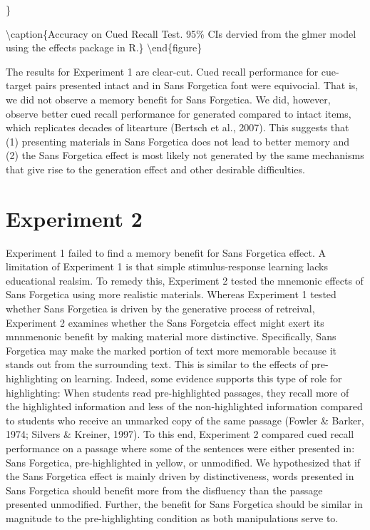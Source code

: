 \documentclass[english,doc]{apa6}
\begin{document}
\}

\textbackslash{}caption\{Accuracy on Cued Recall Test. 95\% CIs dervied from the glmer model using the effects package in R.\}\label{fig:unnamed-chunk-2}
\textbackslash{}end\{figure\}

The results for Experiment 1 are clear-cut. Cued recall performance for cue-target pairs presented intact and in Sans Forgetica font were equivocial. That is, we did not observe a memory benefit for Sans Forgetica. We did, however, observe better cued recall performance for generated compared to intact items, which replicates decades of litearture (Bertsch et al., 2007). This suggests that (1) presenting materials in Sans Forgetica does not lead to better memory and (2) the Sans Forgetica effect is most likely not generated by the same mechanisms that give rise to the generation effect and other desirable difficulties.

\hypertarget{experiment-2}{%
\section{Experiment 2}\label{experiment-2}}

Experiment 1 failed to find a memory benefit for Sans Forgetica effect. A limitation of Experiment 1 is that simple stimulus-response learning lacks educational realsim. To remedy this, Experiment 2 tested the mnemonic effects of Sans Forgetica using more realistic materials. Whereas Experiment 1 tested whether Sans Forgetica is driven by the generative process of retreival, Experiment 2 examines whether the Sans Forgetcia effect might exert its mnnmenonic benefit by making material more distinctive. Specifically, Sans Forgetica may make the marked portion of text more memorable because it stands out from the surrounding text. This is similar to the effects of pre-highlighting on learning. Indeed, some evidence supports this type of role for highlighting: When students read pre-highlighted passages, they recall more of the highlighted information and less of the non-highlighted information compared to students who receive an unmarked copy of the same passage (Fowler \& Barker, 1974; Silvers \& Kreiner, 1997). To this end, Experiment 2 compared cued recall performance on a passage where some of the sentences were either presented in: Sans Forgetica, pre-highlighted in yellow, or unmodified. We hypothesized that if the Sans Forgetica effect is mainly driven by distinctiveness, words presented in Sans Forgetica should benefit more from the disfluency than the passage presented unmodified. Further, the benefit for Sans Forgetica should be similar in magnitude to the pre-highlighting condition as both manipulations serve to.
\end{document}
